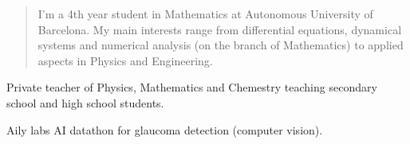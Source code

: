 \documentclass[10pt,a4paper,ragged2e,withhyper]{altacv}
\begin{document}
\begin{paracol}{2}







  \newpage

  \switchcolumn

  \begin{quote}
    I'm a 4th year student in Mathematics at Autonomous University of Bar\-ce\-lo\-na. My main interests range from differential equations, dynamical systems and numerical analysis (on the branch of Mathematics) to applied aspects in Physics and Engineering.
  \end{quote}

  Private teacher of Physics, Mathematics and Chemestry teaching secondary school and high school students.

  \divider
  Aily labs AI datathon for glaucoma detection (computer vision).


\end{paracol}
\end{document}
